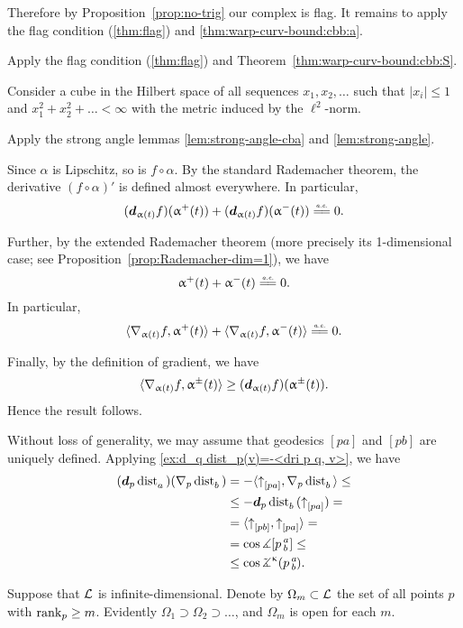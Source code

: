 Therefore by Proposition~\ref{prop:no-trig} our complex is flag.
It remains to apply the flag condition (\ref{thm:flag}) and \ref{thm:warp-curv-bound:cbb:a}.

Apply the flag condition (\ref{thm:flag}) and Theorem~\ref{thm:warp-curv-bound:cbb:S}.

Consider a cube in the Hilbert space
of all sequences $x_1,x_2,\dots$ such that $|x_i|\le 1$ and $x_1^2+x_2^2+\dots<\infty$ with the metric induced by the $\ell^2$-norm.

 Apply the strong angle lemmas
\ref{lem:strong-angle-cba}
and \ref{lem:strong-angle}.


Since $\alpha$ is Lipschitz, so is $f\circ\alpha$.
By the standard Rademacher theorem, the derivative $(f\circ\alpha)'$ is defined almost everywhere.
In particular, 
\[(\dd_{\alpha(t)}f)(\alpha^+(t))+(\dd_{\alpha(t)}f)(\alpha^-(t))\ae0.\]

Further, by the extended Rademacher theorem (more precisely its 1-dimensional case; see Proposition~\ref{prop:Rademacher-dim=1}),
we have 
\[\alpha^+(t)+\alpha^-(t)\ae0.\]
In particular,
\[\<\nabla_{\alpha(t)}f,\alpha^+(t)\>+\<\nabla_{\alpha(t)}f,\alpha^-(t)\>
\ae0.\]

Finally, by the definition of gradient, we have 
\[\<\nabla_{\alpha(t)}f,\alpha^\pm(t)\>\ge (\dd_{\alpha(t)}f)(\alpha^\pm(t)).\]
Hence the result follows.

Without loss of generality, we may assume that geodesics $[pa]$ and $[pb]$ are uniquely defined.
Applying \ref{ex:d_q dist_p(v)=-<dri p q, v>}, we have
\begin{align*}(\dd_p\distfun{a}{}{})(\nabla_p\distfun{b}{}{})&=-\langle\dir pa,\nabla_p\distfun{b}{}{} \rangle\le
\\
&\le -\dd_p\distfun{b}{}{}(\dir pa)=
\\
&=\langle\dir pb, \dir pa\rangle=
\\
&= \cos\mangle\hinge p a b \le 
\\
&\le \cos\angk\kappa p a b.
\end{align*}


Suppose that $\mathcal{L}$ is infinite-dimensional.
Denote by $\Omega_m\subset \spc{L}$ the set of all points $p$ with $\rank_p\ge m$.
Evidently $\Omega_1\supset \Omega_2\supset\dots$, and $\Omega_m$ is open for each $m$.

